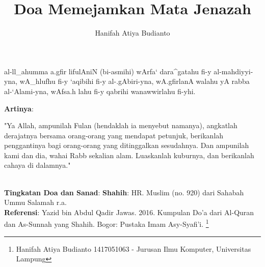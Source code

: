 \documentclass[a4paper,12pt]{article}
\title{\Large Doa Memejamkan Mata Jenazah}
\author{\calligra Hanifah Atiya Budianto}
\begin{document}
\sffamily
\maketitle 
\fullvocalize
{}
\begin{arabtext}
\noindent
al-ll_ahumma a.gfir lifulAniN (bi-asmihi) wArfa` dara^gatahu fi-y 
al-mahdiyyi-yna, wA_hlufhu fi-y `aqibihi fi-y al-.gAbiri-yna, wA.gfirlanA 
walahu yA rabba al-`Alami-yna, wAfsa.h lahu fi-y qabrihi wanawwirlahu 
fi-yhi.\\
\end{arabtext}
\noindent
\textbf{Artinya}:
\par
\indent
"Ya Allah, ampunilah Fulan (hendaklah ia menyebut namanya), angkatlah 
derajatnya bersama orang-orang yang mendapat petunjuk, berikanlah 
penggantinya bagi orang-orang yang ditinggalkan sesudahnya. Dan ampunilah 
kami dan dia, wahai Rabb sekalian alam. Luaskanlah kuburnya, dan 
berikanlah cahaya di dalamnya."\\\\
\par
\noindent
\textbf{Tingkatan Doa dan Sanad}: \textbf{Shahih}: HR. Muslim (no. 920) 
dari Sahabah Ummu Salamah r.a.\\
\textbf{Referensi}: Yazid bin Abdul Qadir Jawas. 2016. Kumpulan Do'a dari
Al-Quran dan As-Sunnah yang Shahih. Bogor: Pustaka Imam Asy-Syafi'i.
\footnote{Hanifah Atiya Budianto 1417051063 - Jurusan Ilmu Komputer,
Universitas Lampung}
\end{document}
